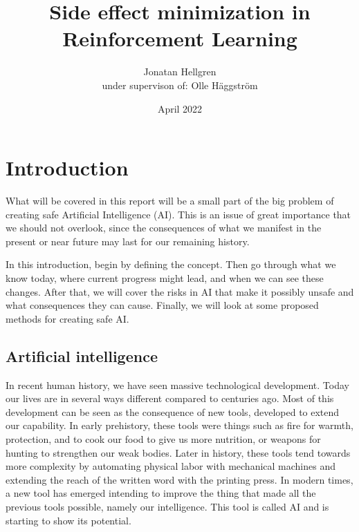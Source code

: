 \documentclass[12pt,A4]{report}
\title{Side effect minimization in Reinforcement Learning}
\author{Jonatan Hellgren\\
under supervison of: Olle Häggström}
\date{April 2022}
\theoremstyle{definition}
\begin{document}
\maketitle


\thispagestyle{empty}

\newpage
{}

\tableofcontents

\newpage
{}

% 

\chapter{Introduction}
What will be covered in this report will be a small part of the big problem of creating safe Artificial Intelligence (AI). This is an issue of great importance that we should not overlook, since the consequences of what we manifest in the present or near future may last for our remaining history. 

In this introduction, begin by defining the concept. Then go through what we know today, where current progress might lead, and when we can see these changes. After that, we will cover the risks in AI that make it possibly unsafe and what consequences they can cause. Finally, we will look at some proposed methods for creating safe AI.


\section{Artificial intelligence}
In recent human history, we have seen massive technological development. Today our lives are in several ways different compared to centuries ago. Most of this development can be seen as the consequence of new tools, developed to extend our capability. In early prehistory, these tools were things such as fire for warmth, protection, and to cook our food to give us more nutrition, or weapons for hunting to strengthen our weak bodies. Later in history, these tools tend towards more complexity by automating physical labor with mechanical machines and extending the reach of the written word with the printing press. In modern times, a new tool has emerged intending to improve the thing that made all the previous tools possible, namely our intelligence. This tool is called AI and is starting to show its potential. 
\end{document}
